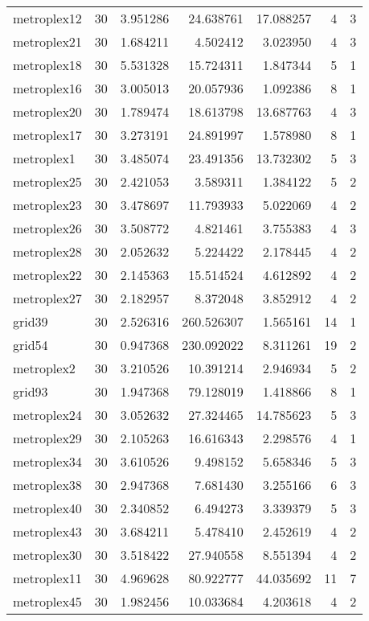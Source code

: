 \documentclass[../../../thesis.tex]{subfiles}
\begin{document}
\begin{longtable}{|l|r|r|r|r|r|r|}
metroplex12 & 30 & 3.951286 & 24.638761 & 17.088257 & 4 & 3 \\
metroplex21 & 30 & 1.684211 & 4.502412 & 3.023950 & 4 & 3 \\
metroplex18 & 30 & 5.531328 & 15.724311 & 1.847344 & 5 & 1 \\
metroplex16 & 30 & 3.005013 & 20.057936 & 1.092386 & 8 & 1 \\
metroplex20 & 30 & 1.789474 & 18.613798 & 13.687763 & 4 & 3 \\
metroplex17 & 30 & 3.273191 & 24.891997 & 1.578980 & 8 & 1 \\
metroplex1 & 30 & 3.485074 & 23.491356 & 13.732302 & 5 & 3 \\
metroplex25 & 30 & 2.421053 & 3.589311 & 1.384122 & 5 & 2 \\
metroplex23 & 30 & 3.478697 & 11.793933 & 5.022069 & 4 & 2 \\
metroplex26 & 30 & 3.508772 & 4.821461 & 3.755383 & 4 & 3 \\
metroplex28 & 30 & 2.052632 & 5.224422 & 2.178445 & 4 & 2 \\
metroplex22 & 30 & 2.145363 & 15.514524 & 4.612892 & 4 & 2 \\
metroplex27 & 30 & 2.182957 & 8.372048 & 3.852912 & 4 & 2 \\
grid39 & 30 & 2.526316 & 260.526307 & 1.565161 & 14 & 1 \\
grid54 & 30 & 0.947368 & 230.092022 & 8.311261 & 19 & 2 \\
metroplex2 & 30 & 3.210526 & 10.391214 & 2.946934 & 5 & 2 \\
grid93 & 30 & 1.947368 & 79.128019 & 1.418866 & 8 & 1 \\
metroplex24 & 30 & 3.052632 & 27.324465 & 14.785623 & 5 & 3 \\
metroplex29 & 30 & 2.105263 & 16.616343 & 2.298576 & 4 & 1 \\
metroplex34 & 30 & 3.610526 & 9.498152 & 5.658346 & 5 & 3 \\
metroplex38 & 30 & 2.947368 & 7.681430 & 3.255166 & 6 & 3 \\
metroplex40 & 30 & 2.340852 & 6.494273 & 3.339379 & 5 & 3 \\
metroplex43 & 30 & 3.684211 & 5.478410 & 2.452619 & 4 & 2 \\
metroplex30 & 30 & 3.518422 & 27.940558 & 8.551394 & 4 & 2 \\
metroplex11 & 30 & 4.969628 & 80.922777 & 44.035692 & 11 & 7 \\
metroplex45 & 30 & 1.982456 & 10.033684 & 4.203618 & 4 & 2 \\

\end{longtable}
\end{document}

